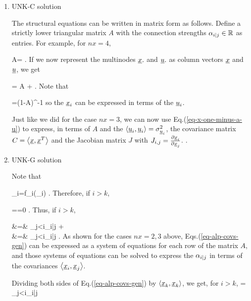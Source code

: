 \begin{enumerate}
\item UNK-C solution

The structural equations can be
written in matrix form
as follows.
Define a strictly lower triangular
matrix $A$
with the connection 
strengths $\alpha_{i|j}\in { \mathbb{R}}$
as entries.
For example, for $nx=4$,

\beq
A=
\;.
\eeq
If we now represent the multinodes
${\underline{x}}.$ and ${\underline{u}}.$ as column vectors
${\underline{x}}$ and ${\underline{u}}$, we get

\beq
\rvx = A \rvx +\rvu
\label{eq-mat-fully-conn}
\;.
\eeq
Note that

\beq
\rvx=(1-A)^{-1}\rvu
\label{eq-x-one-minus-a-u}
\eeq
so the ${\underline{x}}_i$ can be expressed 
in terms of the ${\underline{u}}_i$. 

Just like we did for the
case $nx=3$, we can now
use Eq.(\ref{eq-x-one-minus-a-u}) to
express,
in terms of $A$ and the $\left\langle{\underline{u}}_i, {\underline{u}}_i\right\rangle=
\sigma^2_{{\underline{u}}_i}$, the covariance
matrix $C=\left\langle{\underline{x}}, {\underline{x}}^T\right\rangle$
and the Jacobian matrix 
$J$ with $J_{i,j}=\frac{\partial{\underline{x}}_i}{\partial{\underline{x}}_j}$.
. 

\item UNK-G solution

Note that

\beq
\rvx_i=f_i(\rvu_{\leq i})
\;.
\eeq
Therefore,
if $i>k$,

\beq
{}
==0
\;.
\eeq
Thus, if $i>k$, 

\beqa
{}&=&
\sum_{j<i}\alp_{i|j}
+
\\
&=&
\sum_{j<i}\alp_{i|j}
\;.
\label{eq-alp-covs-gen}
\eeqa
As shown for the cases $nx=2, 3$
above,
Eqs.(\ref{eq-alp-covs-gen}) can be 
expressed as a system of equations
for each row of the matrix $A$,
and those systems of equations can be 
solved to express the $\alpha_{i|j} $
in terms of the covariances $\left\langle{\underline{x}}_i, {\underline{x}}_j\right\rangle$.

Dividing both sides of 
Eq.(\ref{eq-alp-covs-gen}) by $\left\langle{\underline{x}}_k, {\underline{x}}_k\right\rangle$, we get, for $i>k$,
\beq
{}=
\sum_{j<i}\alp_{i|j}
\label{eq-alp-jacobian-gen}
\eeq


\end{enumerate}

